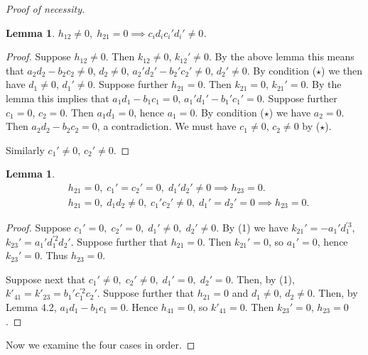 \documentclass{article}
\newtheorem{lem}[thm]{Lemma}
\begin{document}
\begin{proof}[Proof of necessity]
\begin{lem}
$h_{12}\ne 0,\; h_{21}=0 \implies c_id_ic_i'd_i'\ne 0$.

\end{lem}

\begin{proof}
Suppose $h_{12}\ne0$. Then $k_{12}\ne 0$, $k_{12}'\ne 0$. By the above lemma this  means that
$a_2 d_2-b_2 c_2\ne 0$, $d_2\ne 0$, 
$a_2' d_2'-b_2' c_2'\ne 0$, $d_2'\ne 0$.
By condition  ($\star$) we then have
$d_1\ne 0$, $d_1'\ne 0$.
Suppose further $h_{21}=0$. Then $k_{21}=0$, $k_{21}'=0$. By the lemma this implies that
$a_1d_1-b_1c_1=0$, $a_1'd_1'-b_1'c_1'=0$.
Suppose further $c_1=0$, $c_2=0$. Then
$a_1d_1=0$, hence 
$a_1=0$. By condition ($\star$) we have $a_2=0$.
Then $a_2d_2-b_2c_2=0$, a contradiction.
We must have $c_1\ne 0$, $c_2\ne 0$ by ($\star$).

Similarly $c_1'\ne 0$, $c_2'\ne 0$.

\end{proof}

\begin{lem}

\begin{align*}
&h_{21}=0,\; c_1'=c_2'=0, \;d_1'd_2'\ne 0 \implies h_{23}=0.\\
&h_{21}=0, \;d_1d_2\ne 0, \;c_1'c_2'\ne 0, \;d_1'=d_2'=0 \implies h_{23}=0.
\end{align*}


\end{lem}

\begin{proof}
Suppose
$c_1'=0,\; c_2'=0,\;d_1'\ne 0,\; d_2'\ne 0$.
By (1) we have
$k_{21}'=-a_1'd_1^{\prime 3}$,
$k_{23}'=a_1'd_1^{\prime2}d_2'$.
Suppose further that $h_{21}=0$. Then $k_{21}'=0$, so $a_1'=0$, hence $k_{23}'=0$. Thus $h_{23}=0$. 

Suppose next that 
$c_1'\ne 0, \; c_2'\ne 0, \; d_1'=0, \; d_2'=0$.
Then, by (1),
$k'_{41}=k'_{23}=b_1'c_1^{\prime 2}c_2'$.
Suppose further that $h_{21}=0$ and
$d_1\ne 0$, $d_2\ne 0$.
Then, by Lemma 4.2,
$a_1d_1-b_1c_1=0$. Hence $h_{41}=0$, so $k'_{41}=0$.
Then $k_{23}'=0$,  $h_{23}=0$. 
\end{proof}

Now we examine the four cases in order.


\end{proof}
\end{document}
